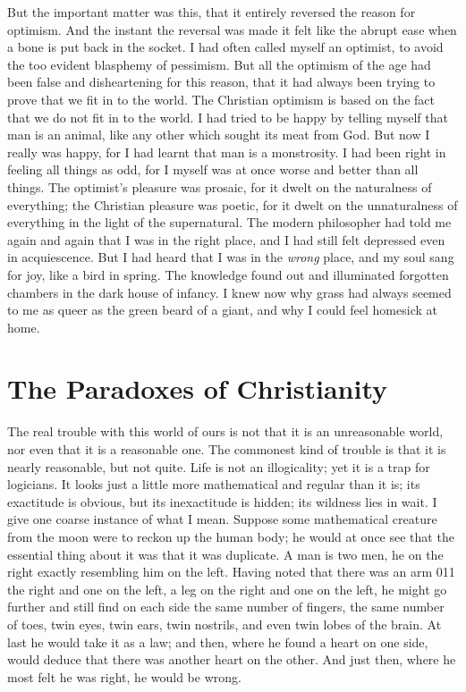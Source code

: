 \documentclass{book}
\begin{document}
But the important matter was this, that it entirely reversed the reason for optimism. And the instant the reversal was made it felt like the abrupt ease when a bone is put back in the socket. I had often called myself an optimist, to avoid the too evident blasphemy of pessimism. But all the optimism of the age had been false and disheartening for this reason, that it had always been trying to prove that we fit in to the world. The Christian optimism is based on the fact that we do not fit in to the world. I had tried to be happy by telling myself that man is an animal, like any other which sought its meat from God. But now I really was happy, for I had learnt that man is a monstrosity. I had been right in feeling all things as odd, for I myself was at once worse and better than all things. The optimist’s pleasure was prosaic, for it dwelt on the naturalness of everything; the Christian pleasure was poetic, for it dwelt on the unnaturalness of everything in the light of the supernatural. The modern philosopher had told me again and again that I was in the right place, and I had still felt depressed even in acquiescence. But I had heard that I was in the \emph{wrong} place, and my soul sang for joy, like a bird in spring. The knowledge found out and illuminated forgotten chambers in the dark house of infancy. I knew now why grass had always seemed to me as queer as the green beard of a giant, and why I could feel homesick at home.

\chapter{The Paradoxes of Christianity}
\label{chapter-5}
The real trouble with this world of ours is not that it is an unreasonable world, nor even that it is a reasonable one. The commonest kind of trouble is that it is nearly reasonable, but not quite. Life is not an illogicality; yet it is a trap for logicians. It looks just a little more mathematical and regular than it is; its exactitude is obvious, but its inexactitude is hidden; its wildness lies in wait. I give one coarse instance of what I mean. Suppose some mathematical creature from the moon were to reckon up the human body; he would at once see that the essential thing about it was that it was duplicate. A man is two men, he on the right exactly resembling him on the left. Having noted that there was an arm 011 the right and one on the left, a leg on the right and one on the left, he might go further and still find on each side the same number of fingers, the same number of toes, twin eyes, twin ears, twin nostrils, and even twin lobes of the brain. At last he would take it as a law; and then, where he found a heart on one side, would deduce that there was another heart on the other. And just then, where he most felt he was right, he would be wrong.
\end{document}
